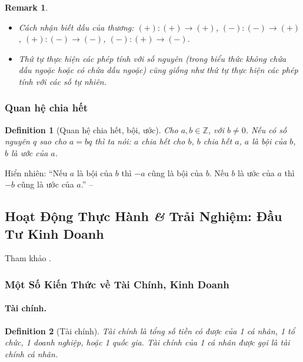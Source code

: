 \documentclass{article}
\numberwithin{equation}{section}
\newtheorem{definition}{Definition}[section]
\newtheorem{remark}{Remark}[section]
\begin{document}
\begin{remark}
	\begin{itemize}
		\item Cách nhận biết dấu của thương: $(+):(+)\to(+)$, $(-):(-)\to(+)$, $(+):(-)\to(-)$, $(-):(+)\to(-)$.
		\item Thứ tự thực hiện các phép tính với số nguyên (trong biểu thức không chứa dấu ngoặc hoặc có chứa dấu ngoặc) cũng giống như thứ tự thực hiện các phép tính với các số tự nhiên.
	\end{itemize}
\end{remark}

\subsubsection{Quan hệ chia hết}

\begin{definition}[Quan hệ chia hết, bội, ước]
	Cho $a,b\in\mathbb{Z}$, với $b\ne 0$. Nếu có số nguyên $q$ sao cho $a = bq$ thì ta nói: $a$ \emph{chia hết cho} $b$, $b$ \emph{chia hết} $a$, $a$ là \emph{bội} của $b$, $b$ là \emph{ước} của $a$.
\end{definition}
Hiển nhiên: ``Nếu $a$ là bội của $b$ thì $-a$ cũng là bội của $b$. Nếu $b$ là ước của $a$ thì $-b$ cũng là ước của $a$.'' -- \cite[p. 86]{Thai_Anh_Dat_Ha_Loan_Nam_Quang_Toan_6_tap_1}

\subsection{Hoạt Động Thực Hành \textit{\&} Trải Nghiệm: Đầu Tư Kinh Doanh}
Tham khảo \cite[pp. 89--92]{Thai_Anh_Dat_Ha_Loan_Nam_Quang_Toan_6_tap_1}.

\subsubsection{Một Số Kiến Thức về Tài Chính, Kinh Doanh}

\paragraph{Tài chính.}
\begin{definition}[Tài chính]
	\emph{Tài chính} là tổng số tiền có được của 1 cá nhân, 1 tổ chức, 1 doanh nghiệp, hoặc 1 quốc gia. Tài chính của 1 cá nhân được gọi là \emph{tài chính cá nhân}.
\end{definition}
\end{document}
